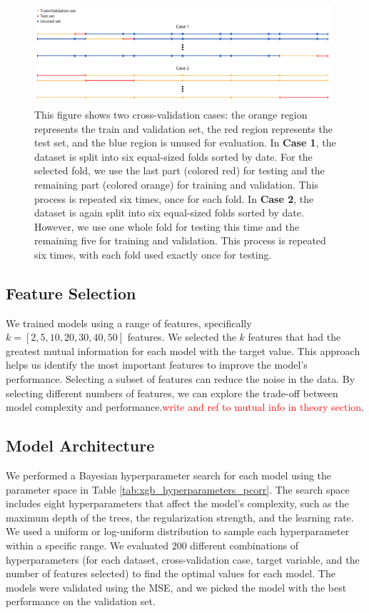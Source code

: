\begin{figure}[H]
    \centering
    \includegraphics[width=0.98\textwidth]{Canva/datasplits.png}
    \caption{This figure shows two cross-validation cases: the orange region represents the train and validation set, the red region represents the test set, and the blue region is unused for evaluation.
    In \textbf{Case 1}, the dataset is split into six equal-sized folds sorted by date.
    For the selected fold, we use the last part (colored red) for testing and the remaining part (colored orange) for training and validation.
    This process is repeated six times, once for each fold.
    In \textbf{Case 2}, the dataset is again split into six equal-sized folds sorted by date.
    However, we use one whole fold for testing this time and the remaining five for training and validation.
    This process is repeated six times, with each fold used exactly once for testing.}
    \label{fig:datasplit_cases}
\end{figure}




\subsection{Feature Selection}
We trained models using a range of features, specifically $k=[2,5,10,20,30,40,50]$ features.
We selected the $k$ features that had the greatest mutual information for each model with the target value.
This approach helps us identify the most important features to improve the model's performance. Selecting a subset of features can reduce the noise in the data. 
By selecting different numbers of features, we can explore the trade-off between model complexity and performance.\textcolor{red}{write and ref to mutual info in theory section}.

\subsection{Model Architecture}
We performed a Bayesian hyperparameter search for each model using the parameter space in Table \ref{tab:xgb_hyperparameters_pcorr}.
The search space includes eight hyperparameters that affect the model's complexity, such as the maximum depth of the trees, the regularization strength, and the learning rate.
We used a uniform or log-uniform distribution to sample each hyperparameter within a specific range.
We evaluated $200$ different combinations of hyperparameters (for each dataset, cross-validation case, target variable, and the number of features selected) to find the optimal values for each model.
The models were validated using the MSE, and we picked the model with the best performance on the validation set.


